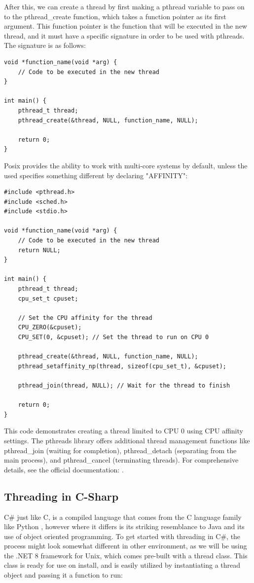 \documentclass[12pt,a4paper]{article}
\begin{document}
After this, we can create a thread by first making a pthread variable to pass on to the pthread\_create function, which takes a function pointer as its first argument. This function pointer is the function that will be executed in the new thread, and it must have a specific signature in order to be used with pthreads. The signature is as follows:

\begin{verbatim}
void *function_name(void *arg) {
    // Code to be executed in the new thread
}

int main() {
    pthread_t thread;
    pthread_create(&thread, NULL, function_name, NULL);

    return 0;
}
\end{verbatim}

Posix provides the ability to work with multi-core systems by default, unless the used specifies something different by declaring "AFFINITY":

\begin{verbatim}
#include <pthread.h>
#include <sched.h>
#include <stdio.h>

void *function_name(void *arg) {
    // Code to be executed in the new thread
    return NULL;
}

int main() {
    pthread_t thread;
    cpu_set_t cpuset;

    // Set the CPU affinity for the thread
    CPU_ZERO(&cpuset);
    CPU_SET(0, &cpuset); // Set the thread to run on CPU 0

    pthread_create(&thread, NULL, function_name, NULL);
    pthread_setaffinity_np(thread, sizeof(cpu_set_t), &cpuset);

    pthread_join(thread, NULL); // Wait for the thread to finish

    return 0;
}
\end{verbatim}
This code demonstrates creating a thread limited to CPU 0 using CPU affinity settings. The pthreads library offers additional thread management functions like pthread\_join (waiting for completion), pthread\_detach (separating from the main process), and pthread\_cancel (terminating threads). For comprehensive details, see the official documentation: .

\subsection{Threading in C-Sharp}

C\# just like C, is a compiled language that comes from the C language family like Python \parencite{PythonFAQ}, however where it differs is its striking resemblance to Java and its use of object oriented programming. To get started with threading in C\#, the process might look somewhat different in other environment, as we will be using the .NET 8 framework for Unix, which comes pre-built with a thread class. This class is ready for use on install, and is easily utilized by instantiating a thread object\parencite{CSThreadClass} and passing it a function to run:
\end{document}
